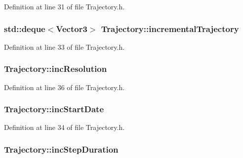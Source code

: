 Definition at line 31 of file Trajectory.\+h.

\hypertarget{class_trajectory_a78edc3b797f73f84656279d08cb2bd37}{
\subsubsection[{incremental\+Trajectory}]{\setlength{\rightskip}{0pt plus 5cm}std\+::deque$<${\bf Vector3}$>$ Trajectory\+::incremental\+Trajectory\hspace{0.3cm}{\ttfamily [protected]}}}\label{class_trajectory_a78edc3b797f73f84656279d08cb2bd37}


Definition at line 33 of file Trajectory.\+h.

\hypertarget{class_trajectory_a8894f4a18e771016f5e76d52209e6eee}{
\subsubsection[{inc\+Resolution}]{ Trajectory\+::inc\+Resolution\hspace{0.3cm}{\ttfamily [protected]}}}\label{class_trajectory_a8894f4a18e771016f5e76d52209e6eee}


Definition at line 36 of file Trajectory.\+h.

\hypertarget{class_trajectory_a37ed928f5e147cf76d702f0aae0f0bee}{
\subsubsection[{inc\+Start\+Date}]{ Trajectory\+::inc\+Start\+Date\hspace{0.3cm}{\ttfamily [protected]}}}\label{class_trajectory_a37ed928f5e147cf76d702f0aae0f0bee}


Definition at line 34 of file Trajectory.\+h.

\hypertarget{class_trajectory_a49cef2583b8b87c9d9afe963d381426d}{
\subsubsection[{inc\+Step\+Duration}]{ Trajectory\+::inc\+Step\+Duration\hspace{0.3cm}{\ttfamily [protected]}}}\label{class_trajectory_a49cef2583b8b87c9d9afe963d381426d}



